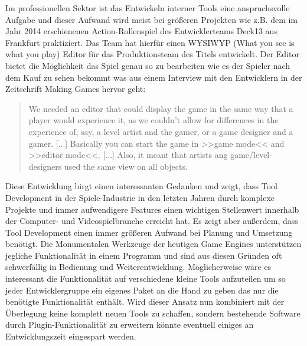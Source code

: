 \documentclass[pagesize, paper=a4, fontsize=12pt, titlepage=true, headings=small, headnosepline, abstractoff, liststotoc, nochapterprefix, plainheadsepline, twoside]{scrreprt}
\begin{document}
Im professionellen Sektor ist das Entwickeln interner Tools eine anspruchsvolle Aufgabe und dieser Aufwand wird meist bei größeren Projekten wie z.B. dem im Jahr 2014 erschienenen Action-Rollenspiel  des Entwicklerteams Deck13 aus Frankfurt praktiziert. Das Team hat hierfür einen WYSIWYP (What you see is what you play) Editor für das Produktionsteam des Titels entwickelt. Der Editor bietet die Möglichkeit das Spiel genau so zu bearbeiten wie es der Spieler nach dem Kauf zu sehen bekommt was aus einem Interview mit den Entwicklern in der Zeitschrift Making Games hervor geht:
\begin{quote}
\glqq We needed an editor that could display the game in the same way that a player would experience it, as we couldn’t allow for differences in the experience of, say, a level artist and the gamer, or a game designer and a gamer. [...] Basically you can start the game in >>game mode<< and >>editor mode<<.  [...] Also, it meant that artists ang game/level-designers used the same view on all objects.\grqq{}

\end{quote}
Diese Entwicklung birgt einen interessanten Gedanken und zeigt, dass Tool Development in der Spiele-Industrie in den letzten Jahren durch komplexe Projekte und immer aufwendigere Features einen wichtigen Stellenwert innerhalb der Computer- und Videospielbranche erreicht hat. Es zeigt aber außerdem, dass Tool Development einen immer größeren Aufwand bei Planung und Umsetzung benötigt. Die Monumentalen Werkzeuge der heutigen Game Engines unterstützen jegliche Funktionalität in einem Programm und sind aus diesen Gründen oft schwerfällig in Bedienung und Weiterentwicklung. Möglicherweise wäre es interessant die Funktionalität auf verschiedene kleine Tools aufzuteilen um so jeder Entwicklergruppe ein eigenes Paket an die Hand zu geben das nur die benötigte Funktionalität enthält. Wird dieser Ansatz nun kombiniert mit der Überlegung keine komplett neuen Tools zu schaffen, sondern bestehende Software durch Plugin-Funktionalität zu erweitern könnte eventuell einiges an Entwicklungszeit eingespart werden.
\end{document}
